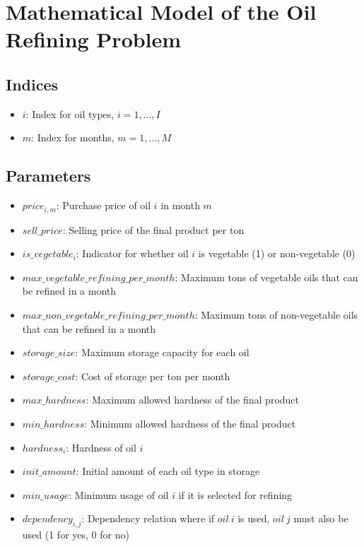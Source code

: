 \documentclass{article}
\begin{document}
\section*{Mathematical Model of the Oil Refining Problem}

\subsection*{Indices}
\begin{itemize}
    \item $i$: Index for oil types, $i = 1, \ldots, I$
    \item $m$: Index for months, $m = 1, \ldots, M$
\end{itemize}

\subsection*{Parameters}
\begin{itemize}
    \item $price_{i,m}$: Purchase price of oil $i$ in month $m$
    \item $sell\_price$: Selling price of the final product per ton
    \item $is\_vegetable_{i}$: Indicator for whether oil $i$ is vegetable (1) or non-vegetable (0)
    \item $max\_vegetable\_refining\_per\_month$: Maximum tons of vegetable oils that can be refined in a month
    \item $max\_non\_vegetable\_refining\_per\_month$: Maximum tons of non-vegetable oils that can be refined in a month
    \item $storage\_size$: Maximum storage capacity for each oil
    \item $storage\_cost$: Cost of storage per ton per month
    \item $max\_hardness$: Maximum allowed hardness of the final product
    \item $min\_hardness$: Minimum allowed hardness of the final product
    \item $hardness_{i}$: Hardness of oil $i$
    \item $init\_amount$: Initial amount of each oil type in storage
    \item $min\_usage$: Minimum usage of oil $i$ if it is selected for refining
    \item $dependency_{i,j}$: Dependency relation where if $oil\ i$ is used, $oil\ j$ must also be used (1 for yes, 0 for no)
\end{itemize}
\end{document}
